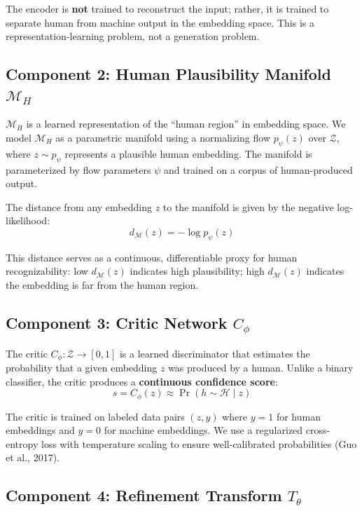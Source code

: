 \documentclass[12pt,oneside]{article}
\begin{document}
The encoder is \textbf{not} trained to reconstruct the input; rather, it is trained to separate human from machine output in the embedding space. This is a representation-learning problem, not a generation problem.

\subsection{Component 2: Human Plausibility Manifold $\mathcal{M}_H$}

$\mathcal{M}_H$ is a learned representation of the ``human region'' in embedding space. We model $\mathcal{M}_H$ as a parametric manifold using a normalizing flow $p_\psi(z)$ over $\mathcal{Z}$, where $z \sim p_\psi$ represents a plausible human embedding. The manifold is parameterized by flow parameters $\psi$ and trained on a corpus of human-produced output.

The distance from any embedding $z$ to the manifold is given by the negative log-likelihood:
\begin{equation}
d_\mathcal{M}(z) = -\log p_\psi(z)
\end{equation}

This distance serves as a continuous, differentiable proxy for human recognizability: low $d_\mathcal{M}(z)$ indicates high plausibility; high $d_\mathcal{M}(z)$ indicates the embedding is far from the human region.

\subsection{Component 3: Critic Network $C_\phi$}

The critic $C_\phi: \mathcal{Z} \to [0, 1]$ is a learned discriminator that estimates the probability that a given embedding $z$ was produced by a human. Unlike a binary classifier, the critic produces a \textbf{continuous confidence score}:
\begin{equation}
s = C_\phi(z) \approx \Pr(h \sim \mathcal{H} \mid z)
\end{equation}

The critic is trained on labeled data pairs $(z, y)$ where $y = 1$ for human embeddings and $y = 0$ for machine embeddings. We use a regularized cross-entropy loss with temperature scaling to ensure well-calibrated probabilities (Guo et al., 2017).

\subsection{Component 4: Refinement Transform $T_\theta$}
\end{document}

